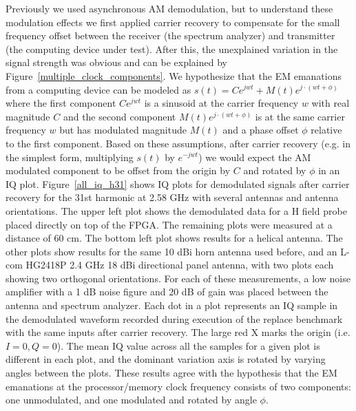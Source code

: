 
Previously we used asynchronous AM demodulation, but to understand these modulation effects we first applied carrier recovery to compensate for the small frequency offset between the receiver (the spectrum analyzer) and transmitter (the computing device under test). After this, the unexplained variation in the signal strength was obvious and can be explained by Figure~\ref{multiple_clock_components}. We hypothesize that the EM emanations from a computing device can be modeled as $s(t) = C e^{jwt} + M(t) e^{j\cdot(wt+\phi)}$ where the first component $C e^{jwt}$ is a sinusoid at the carrier frequency $w$ with real magnitude $C$ and the second component $M(t) e^{j\cdot(wt+\phi)}$ is at the same carrier frequency $w$ but has modulated magnitude $M(t)$ and a phase offset $\phi$ relative to the first component. Based on these assumptions, after carrier recovery (e.g. in the simplest form, multiplying $s(t)$ by $e^{-jwt}$) we would expect the AM modulated component to be offset from the origin by $C$ and rotated by $\phi$ in an IQ plot. Figure~\ref{all_iq_h31} shows IQ plots for demodulated signals after carrier recovery for the 31st harmonic at 2.58 GHz with several antennas and antenna orientations. The upper left plot shows the demodulated data for a H field probe placed directly on top of the FPGA. The remaining plots were measured at a distance of 60 cm. The bottom left plot shows results for a helical antenna. The other plots show results for the same 10 dBi horn antenna used before, and an L-com HG2418P 2.4 GHz 18 dBi directional panel antenna, with two plots each showing two orthogonal orientations. For each of these measurements, a low noise amplifier with a 1 dB noise figure and 20 dB of gain was placed between the antenna and spectrum analyzer. Each dot in a plot represents an IQ sample in the demodulated waveform recorded during execution of the replace benchmark with the same inputs after carrier recovery. The large red X marks the origin (i.e. $I=0, Q=0$). The mean IQ value across all the samples for a given plot is different in each plot, and the dominant variation axis is rotated by varying angles between the plots. These results agree with the hypothesis that the EM emanations at the processor/memory clock frequency consists of two components: one unmodulated, and one modulated and rotated by angle $\phi$.

